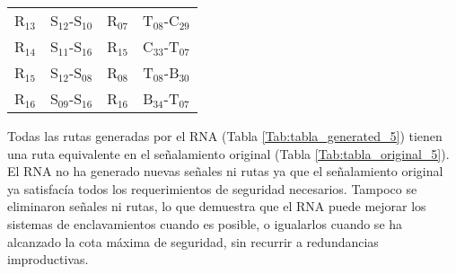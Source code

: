 \begin{table}[H]
{\begin{center}
{\begin{tabular}{ c c c c }
                    R$_{13}$ & S$_{12}$-S$_{10}$ & R$_{07}$ & T$_{08}$-C$_{29}$ \\
                    R$_{14}$ & S$_{11}$-S$_{16}$ & R$_{15}$ & C$_{33}$-T$_{07}$ \\
                    R$_{15}$ & S$_{12}$-S$_{08}$ & R$_{08}$ & T$_{08}$-B$_{30}$ \\
                    R$_{16}$ & S$_{09}$-S$_{16}$ & R$_{16}$ & B$_{34}$-T$_{07}$ \\
                \hline
            \end{tabular}
            }
            \end{center}
        }    
    \end{table}
    
    Todas las rutas generadas por el RNA (Tabla \ref{Tab:tabla_generated_5}) tienen una ruta equivalente en el señalamiento original (Tabla \ref{Tab:tabla_original_5}). El RNA no ha generado nuevas señales ni rutas ya que el señalamiento original ya satisfacía todos los requerimientos de seguridad necesarios. Tampoco se eliminaron señales ni rutas, lo que demuestra que el RNA puede mejorar los sistemas de enclavamientos cuando es posible, o igualarlos cuando se ha alcanzado la cota máxima de seguridad, sin recurrir a redundancias improductivas.